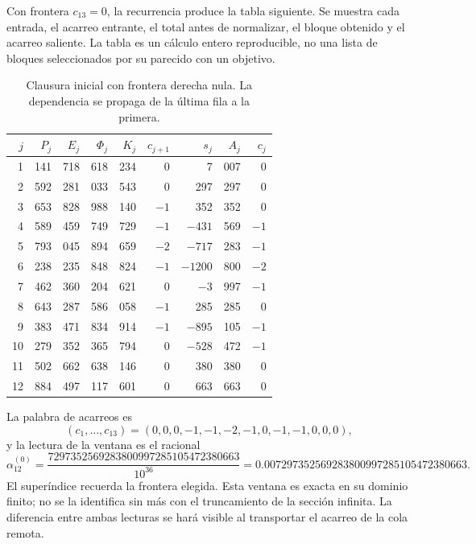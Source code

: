 Con frontera \(c_{13}=0\), la recurrencia produce la tabla siguiente.
Se muestra cada entrada, el acarreo entrante, el total antes de normalizar,
el bloque obtenido y el acarreo saliente. La tabla es un cálculo entero
reproducible, no una lista de bloques seleccionados por su parecido con
un objetivo.

\begin{table}[htbp]
\centering
\small
\setlength{\tabcolsep}{3.5pt}
\begin{tabular}{r|rrrr|rr|rr}
\hline
\(j\)&\(P_j\)&\(E_j\)&\(\Phi_j\)&\(K_j\)&\(c_{j+1}\)&\(s_j\)&\(A_j\)&\(c_j\)\\
\hline
1&141&718&618&234&0&7&007&0\\
2&592&281&033&543&0&297&297&0\\
3&653&828&988&140&\(-1\)&352&352&0\\
4&589&459&749&729&\(-1\)&\(-431\)&569&\(-1\)\\
5&793&045&894&659&\(-2\)&\(-717\)&283&\(-1\)\\
6&238&235&848&824&\(-1\)&\(-1200\)&800&\(-2\)\\
7&462&360&204&621&0&\(-3\)&997&\(-1\)\\
8&643&287&586&058&\(-1\)&285&285&0\\
9&383&471&834&914&\(-1\)&\(-895\)&105&\(-1\)\\
10&279&352&365&794&0&\(-528\)&472&\(-1\)\\
11&502&662&638&146&0&380&380&0\\
12&884&497&117&601&0&663&663&0\\
\hline
\end{tabular}
\caption{Clausura inicial con frontera derecha nula. La dependencia se propaga de la última fila a la primera.}
\label{x_reciprocidad:tab:alpha-ventana}
\end{table}

La palabra de acarreos es
\[
 (c_1,\ldots,c_{13})=(0,0,0,-1,-1,-2,-1,0,-1,-1,0,0,0),
\]
y la lectura de la ventana es el racional
\begin{equation}
 \alpha_{12}^{(0)}
 =\frac{7297352569283800997285105472380663}{10^{36}}
 =0.007297352569283800997285105472380663.
 \label{x_reciprocidad:eq:alpha-ventana-cero}
\end{equation}
El superíndice recuerda la frontera elegida. Esta ventana es exacta en su
dominio finito; no se la identifica sin más con el truncamiento de la
sección infinita. La diferencia entre ambas lecturas se hará visible al
transportar el acarreo de la cola remota.

